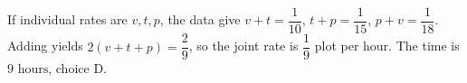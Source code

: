If individual rates are $v,t,p$, the data give $v+t=\dfrac{1}{10}$, $t+p=\dfrac{1}{15}$, $p+v=\dfrac{1}{18}$. Adding yields $2(v+t+p)=\dfrac{2}{9}$, so the joint rate is $\dfrac{1}{9}$ plot per hour. The time is $\boxed{9\text{ hours}}$, choice D.
